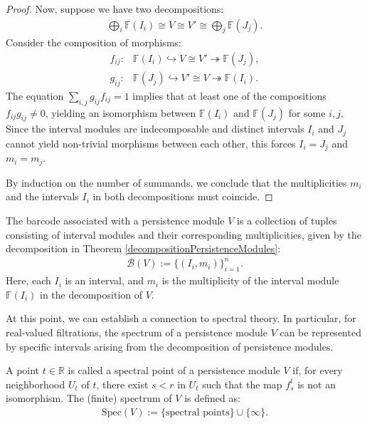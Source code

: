 \begin{proof}
Now, suppose we have two decompositions:
\begin{align}
	\bigoplus_i \mathbb{F}(I_i) \cong V \cong V' \cong \bigoplus_j \mathbb{F}(J_j).
\end{align}
Consider the composition of morphisms:
\begin{align}
	f_{ij}: &\mathbb{F}(I_i) \hookrightarrow V \cong V' \twoheadrightarrow \mathbb{F}(J_j),\\
	g_{ij}: &\mathbb{F}(J_j) \hookrightarrow V' \cong V \twoheadrightarrow \mathbb{F}(I_i).
\end{align}
The equation $\sum_{i,j} g_{ij}f_{ij} = 1$ implies that at least one of the compositions $f_{ij}g_{ij} \neq 0$, yielding an isomorphism between $\mathbb{F}(I_i)$ and $\mathbb{F}(J_j)$ for some $i, j$. Since the interval modules are indecomposable and distinct intervals $I_i$ and $J_j$ cannot yield non-trivial morphisms between each other, this forces $I_i = J_j$ and $m_i = m_j$. 

By induction on the number of summands, we conclude that the multiplicities $m_i$ and the intervals $I_i$ in both decompositions must coincide.
\end{proof}

\begin{definition}
The barcode associated with a persistence module $V$ is a collection of tuples consisting of interval modules and their corresponding multiplicities, given by the decomposition in Theorem \ref{decompositionPersistenceModules}:
\begin{align}
	\mathcal{B}(V) := \{(I_i, m_i)\}_{i=1}^n.
\end{align}
Here, each $I_i$ is an interval, and $m_i$ is the multiplicity of the interval module $\mathbb{F}(I_i)$ in the decomposition of $V$.
\end{definition}

At this point, we can establish a connection to spectral theory. In particular, for real-valued filtrations, the spectrum of a persistence module $V$ can be represented by specific intervals arising from the decomposition of persistence modules.

\begin{definition}[Spectrum]
A point $t \in \mathbb{R}$ is called a spectral point of a persistence module $V$ if, for every neighborhood $U_t$ of $t$, there exist $s < r$ in $U_t$ such that the map $f_{s}^t$ is not an isomorphism. The (finite) spectrum of $V$ is defined as:
\begin{align}
	\text{Spec}(V) := \{ \text{spectral points} \} \cup \{\infty\}.
\end{align}
\end{definition}

